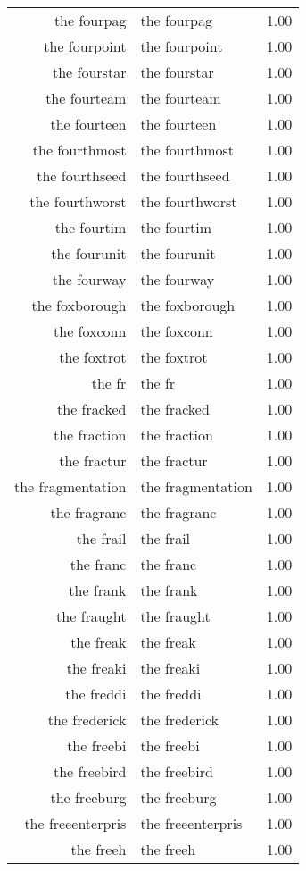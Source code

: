 \begin{table}[ht]
\begin{tabular}{rlr}
  the fourpag & the fourpag & 1.00 \\ 
  the fourpoint & the fourpoint & 1.00 \\ 
  the fourstar & the fourstar & 1.00 \\ 
  the fourteam & the fourteam & 1.00 \\ 
  the fourteen & the fourteen & 1.00 \\ 
  the fourthmost & the fourthmost & 1.00 \\ 
  the fourthseed & the fourthseed & 1.00 \\ 
  the fourthworst & the fourthworst & 1.00 \\ 
  the fourtim & the fourtim & 1.00 \\ 
  the fourunit & the fourunit & 1.00 \\ 
  the fourway & the fourway & 1.00 \\ 
  the foxborough & the foxborough & 1.00 \\ 
  the foxconn & the foxconn & 1.00 \\ 
  the foxtrot & the foxtrot & 1.00 \\ 
  the fr & the fr & 1.00 \\ 
  the fracked & the fracked & 1.00 \\ 
  the fraction & the fraction & 1.00 \\ 
  the fractur & the fractur & 1.00 \\ 
  the fragmentation & the fragmentation & 1.00 \\ 
  the fragranc & the fragranc & 1.00 \\ 
  the frail & the frail & 1.00 \\ 
  the franc & the franc & 1.00 \\ 
  the frank & the frank & 1.00 \\ 
  the fraught & the fraught & 1.00 \\ 
  the freak & the freak & 1.00 \\ 
  the freaki & the freaki & 1.00 \\ 
  the freddi & the freddi & 1.00 \\ 
  the frederick & the frederick & 1.00 \\ 
  the freebi & the freebi & 1.00 \\ 
  the freebird & the freebird & 1.00 \\ 
  the freeburg & the freeburg & 1.00 \\ 
  the freeenterpris & the freeenterpris & 1.00 \\ 
  the freeh & the freeh & 1.00 \\ 

\end{tabular}
\end{table}
